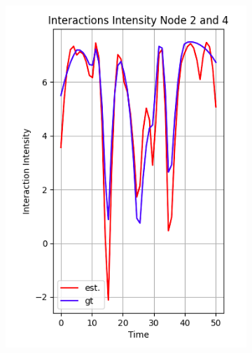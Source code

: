 \begin{figure}[H]
\begin{subfigure}[b]{0.45\textwidth}
        \includegraphics[width=\textwidth]{0_images/rq1_10step_SCVM_intensity3.png}
    \end{subfigure}
    \hfill
    \begin{subfigure}[b]{0.45\textwidth}
        \centering

\end{subfigure}
\end{figure}
